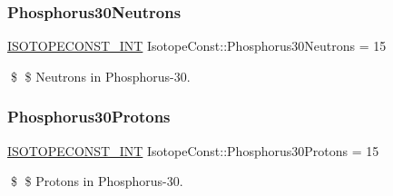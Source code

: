 \subsubsection{\texorpdfstring{Phosphorus30\+Neutrons}{Phosphorus30Neutrons}}
{\footnotesize\ttfamily \mbox{\hyperlink{group___isotope_const-_macros_ga5f18360b3e99483a35c32d789e62621c}{I\+S\+O\+T\+O\+P\+E\+C\+O\+N\+S\+T\+\_\+\+I\+NT}} Isotope\+Const\+::\+Phosphorus30\+Neutrons = 15}

\$ \$ Neutrons in Phosphorus-\/30. \mbox{\label{group___isotope_const-_phosphorus-_p30_ga5e484ab61048ec907367d1d347bb8b08}} 
\subsubsection{\texorpdfstring{Phosphorus30\+Protons}{Phosphorus30Protons}}
{\footnotesize\ttfamily \mbox{\hyperlink{group___isotope_const-_macros_ga5f18360b3e99483a35c32d789e62621c}{I\+S\+O\+T\+O\+P\+E\+C\+O\+N\+S\+T\+\_\+\+I\+NT}} Isotope\+Const\+::\+Phosphorus30\+Protons = 15}

\$ \$ Protons in Phosphorus-\/30. 